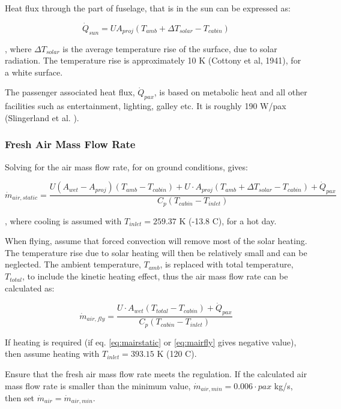 \documentclass[english]{kththesis}
\begin{document}
Heat flux through the part of fuselage, that is in the sun can be expressed as:

\begin{equation}
\dot{Q}_{sun} = U A_{proj} (T_{amb} + \Delta T_{solar} - T_{cabin})
\end{equation}

, where $\Delta T_{solar}$ is the average temperature rise of the surface, due to solar radiation. The temperature rise is approximately 10 K (Cottony et al, 1941), for a white surface.

The passenger associated heat flux, $\dot{Q}_{pax}$, is based on metabolic heat and all other facilities such as entertainment, lighting, galley etc. It is roughly 190 W/pax (Slingerland et al. \cite{Slingerland2007}).

\subsubsection{Fresh Air Mass Flow Rate}
\label{subsubsec:ACMair}

Solving for the air mass flow rate, for on ground conditions, gives:

\begin{equation}
\label{eq:mairstatic}
\dot{m}_{air,static} = \frac{U (A_{wet} - A_{proj}) (T_{amb} - T_{cabin}) + U \cdot A_{proj} (T_{amb} + \Delta T_{solar} - T_{cabin}) + \dot{Q}_{pax}}{C_p (T_{cabin} - T_{inlet})}
\end{equation}

, where cooling is assumed with $T_{inlet}=259.37$ K (-13.8 \degree C), for a hot day.

When flying, assume that forced convection will remove most of the solar heating. The temperature rise due to solar heating will then be relatively small and can be neglected. The ambient temperature, $T_{amb}$, is replaced with total temperature, $T_{total}$, to include the kinetic heating effect, thus the air mass flow rate can be calculated as:

\begin{equation}
\label{eq:mairfly}
\dot{m}_{air,fly} = \frac{U \cdot A_{wet} (T_{total} - T_{cabin}) + \dot{Q}_{pax}}{C_p (T_{cabin} - T_{inlet})}
\end{equation}

If heating is required (if eq. \ref{eq:mairstatic} or \ref{eq:mairfly} gives negative value), then assume heating with $T_{inlet}=393.15$ K (120 \degree C).

Ensure that the fresh air mass flow rate meets the regulation. If the calculated air mass flow rate is smaller than the minimum value, $\dot{m}_{air,min}=0.006 \cdot pax$ kg/s, then set $\dot{m}_{air}=\dot{m}_{air,min}$.
\end{document}
